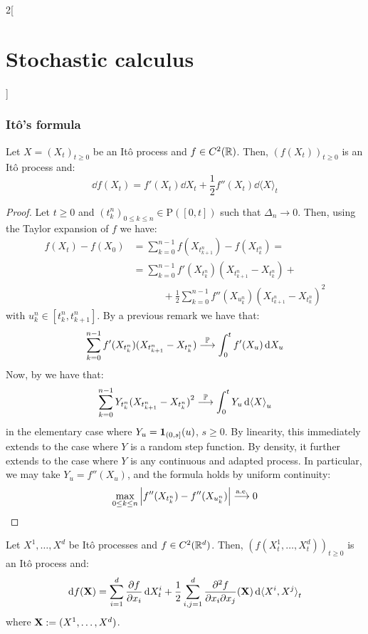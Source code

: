 \documentclass[../../../main_math.tex]{subfiles}
\begin{document}
\begin{multicols}{2}[\section{Stochastic calculus}]
  \subsubsection{Itô's formula}
  \begin{theorem}\label{SC:ito_formula}
    Let $X={(X_t)}_{t\geq 0}$ be an Itô process and $f\in C^2(\mathbb{R})$. Then, ${(f(X_t))}_{t\geq 0}$ is an Itô process and:
    $$
      \dd{f(X_t)}=f'(X_t)\dd{X_t}+\frac{1}{2}f''(X_t)\dd{{\langle X\rangle}_t}
    $$
  \end{theorem}
  \begin{proof}
    Let $t\geq 0$ and ${(t_k^n)}_{0\leq k\leq n}\in \mathrm{P}([0,t])$ such that $\Delta_n\to 0$. Then, using the Taylor expansion of $f$ we have:
    \begin{align*}
      f(X_t)-f(X_0) & =\sum_{k=0}^{n-1}f(X_{t_{k+1}^n})-f(X_{t_k^n})=                                    \\&=\sum_{k=0}^{n-1}f'(X_{t_k^n})(X_{t_{k+1}^n}-X_{t_k^n})+\\
                    & \qquad\quad+\frac{1}{2}\sum_{k=0}^{n-1}f''(X_{u_k^n}){(X_{t_{k+1}^n}-X_{t_k^n})}^2
    \end{align*}
    with $u_k^n\in [t_k^n,t_{k+1}^n]$. By a previous remark we have that:
    $$
      \sum_{k=0}^{n-1}f'(X_{t_k^n})(X_{t_{k+1}^n}-X_{t_k^n})\overset{\mathbb{P}}{\longrightarrow} \int_0^t f'(X_u)\dd{X_u}
    $$
    Now, by  we have that:
    $$
      \sum_{k=0}^{n-1}Y_{t_k^n}{(X_{t_{k+1}^n}-X_{t_k^n})}^2 \overset{\mathbb{P}}{\longrightarrow} \int_0^t Y_u\dd{{\langle X\rangle}_u}
    $$
    in the elementary case where $Y_u=\boldsymbol{\mathrm{1}}_{(0,s]}(u)$, $s\geq 0$. By linearity, this immediately extends to the case where $Y$ is a random step function. By density, it further extends to the case where $Y$ is any continuous and adapted process. In particular, we may take
    $Y_u=f''(X_u)$, and the formula holds by uniform continuity:
    $$
      \max_{0\leq k\leq n}\abs{f''(X_{t_k^n})-f''(X_{u_k^n})}\overset{\text{a.e.}}{\longrightarrow} 0
    $$
  \end{proof}
  \begin{theorem}
    Let $X^1,\ldots,X^d$ be Itô processes and $f\in C^2(\mathbb{R}^d)$. Then, ${(f(X^1_t,\ldots,X^d_t))}_{t\geq 0}$ is an Itô process and:
    $$
      \dd{f(\boldsymbol{\mathrm{X}})} =\sum_{i=1}^d\pdv{f}{x_i}(\boldsymbol{\mathrm{X}})\dd{X^i_t}+\frac{1}{2}\sum_{i,j=1}^d\frac{\partial^2 f}{\partial x_i\partial x_j}(\boldsymbol{\mathrm{X}})\dd{{\langle X^i,X^j\rangle}_t}
    $$
    where $\boldsymbol{\mathrm{X}}:=(X^1,\ldots,X^d)$.
  \end{theorem}

\end{multicols}
\end{document}
